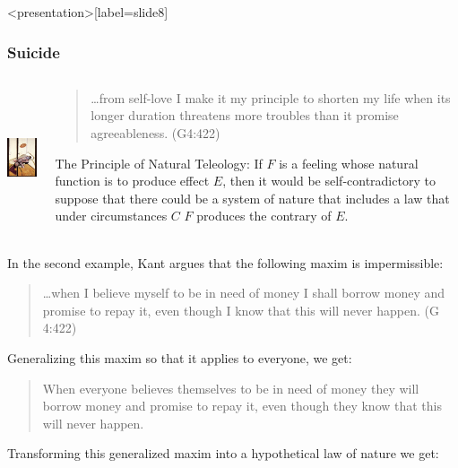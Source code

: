 \begin{frame}<presentation>[label=slide8]
    \frametitle{Suicide}
        \begin{columns}
            \begin{column}{3cm}
                \includegraphics[height=4cm]{../../graphics/suicide.jpg}
            \end{column}
            \begin{column}{7cm}
                \begin{quote}
                    \ldots from self-love I make it my principle to shorten my life when its longer duration threatens more troubles than it promise agreeableness. (G4:422)
                \end{quote}
                \alert{The Principle of Natural Teleology}: If $F$ is a feeling whose natural function is to produce effect $E$, then it would be self-contradictory to suppose that there could be a system of nature that includes a law that under circumstances $C$ $F$ produces the contrary of $E$.
            \end{column}
        \end{columns}
\end{frame}

In the second example, Kant argues that the following maxim is impermissible:

\begin{quote}
	\ldots when I believe myself to be in need of money I shall borrow money and promise to repay it, even though I know that this will never happen. (G 4:422)
\end{quote}

Generalizing this maxim so that it applies to everyone, we get:

\begin{quote}
	When everyone believes themselves to be in need of money they will borrow money and promise to repay it, even though they know that this will never happen.
\end{quote}

Transforming this generalized maxim into a hypothetical law of nature we get:


